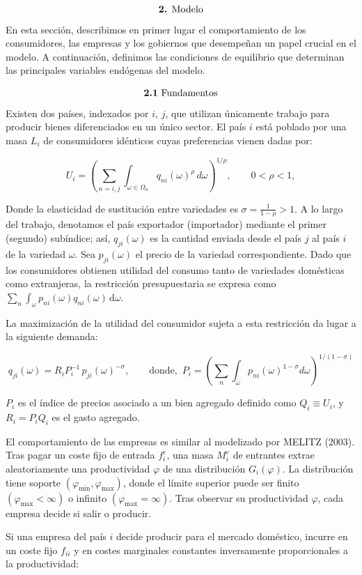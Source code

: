 \documentclass[10pt,a4paper]{article}
\begin{document}
$$\text{\textbf{2.} Modelo}$$
En esta sección, describimos en primer lugar el comportamiento de los consumidores, las empresas y los gobiernos que desempeñan un papel crucial en el modelo. A continuación, definimos las condiciones de equilibrio que determinan las principales variables endógenas del modelo.

$$\text{\textbf{2.1} Fundamentos}$$
Existen dos países, indexados por $i$, $j$, que utilizan únicamente trabajo para producir bienes diferenciados en un único sector. El país $i$ está poblado por una masa $L_i$ de consumidores idénticos cuyas preferencias vienen dadas por:

$$U_i =\left(\sum_{n=i,j}\int_{\omega \in \Omega_n}q_{ni}(\omega)^{\rho} \, d\omega\right)^{1/\rho},\qquad 0 < \rho < 1,$$

Donde la elasticidad de sustitución entre variedades es $\sigma = \frac{1}{1-\rho} > 1$. A lo largo del trabajo, denotamos el país exportador (importador) mediante el primer (segundo) subíndice; así, $q_{ji}(\omega)$ es la cantidad enviada desde el país $j$ al país $i$ de la variedad $\omega$. Sea $p_{ji}(\omega)$ el precio de la variedad correspondiente. Dado que los consumidores obtienen utilidad del consumo tanto de variedades domésticas como extranjeras, la restricción presupuestaria se expresa como $\sum_n \int_\omega p_{ni}(\omega) q_{ni}(\omega)\, \mathrm d\omega$.

La maximización de la utilidad del consumidor sujeta a esta restricción da lugar a la siguiente demanda:

$$q_{ji}(\omega) = R_i P_i^{-1} \, p_{ji}(\omega)^{-\sigma},\qquad \text{donde},\,\, P_i = \left( \sum_n \int_\omega p_{ni}(\omega)^{1-\sigma} d\omega \right)^{1/(1-\sigma)}$$

$P_i$ es el índice de precios asociado a un bien agregado definido como $Q_i \equiv U_i$, y $R_i = P_i Q_i$ es el gasto agregado.

El comportamiento de las empresas es similar al modelizado por MELITZ (2003). Tras pagar un coste fijo de entrada $f_i^e$, una masa $M_i^e$ de entrantes extrae aleatoriamente una productividad $\varphi$ de una distribución $G_i(\varphi)$. La distribución tiene soporte $(\varphi_{\min}, \varphi_{\max})$, donde el límite superior puede ser finito $(\varphi_{\max} < \infty)$ o infinito $(\varphi_{\max} = \infty)$. Tras observar su productividad $\varphi$, cada empresa decide si salir o producir. 

Si una empresa del país $i$ decide producir para el mercado doméstico, incurre en un coste fijo $f_{ii}$ y en costes marginales constantes inversamente proporcionales a la productividad:
\end{document}
